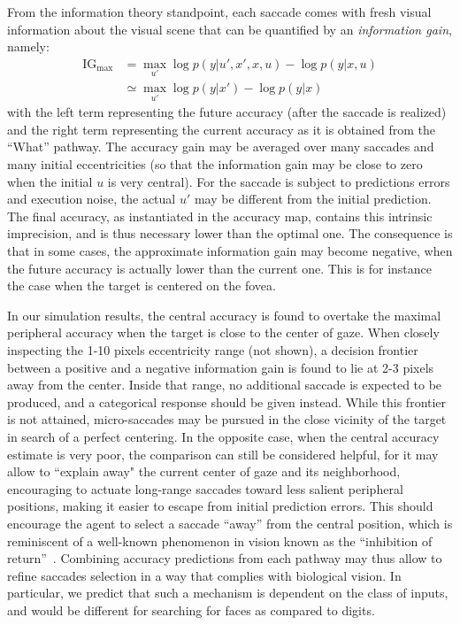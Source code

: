 From the information theory standpoint, each saccade comes with fresh visual information about the visual scene that can be quantified by an \emph{information gain}, namely:
\begin{align}
\text{IG}_\text{max} &= \max_{u'} \log p(y|u',x',x, u) - \log p(y|x, u)\nonumber\\
&\simeq \max_{u'} \log p(y|x') - \log p(y|x)\label{eq:IG}
\end{align}
with the left term representing the future accuracy (after the saccade is realized) and the right term representing the current accuracy as it is obtained from the ``What'' pathway. The accuracy gain may be averaged over many saccades and many initial eccentricities (so that the information gain may be close to zero when the initial $u$ is very central).
For the saccade is subject to predictions errors and execution noise, the actual $u'$ may be different from the initial prediction. The final accuracy, as instantiated in the accuracy map, contains this intrinsic imprecision, and is thus necessary lower than the optimal one. The consequence is that in some cases, the approximate information gain may become negative, when the future accuracy is actually lower than the current one. This is for instance the case when the target is centered on the fovea.

In our simulation results, the central accuracy is found to overtake the maximal peripheral accuracy when the target is close to the center of gaze. When closely inspecting the 1-10 pixels eccentricity range (not shown), a decision frontier between a positive and a negative information gain is found to lie at 2-3 pixels away from the center. Inside that range, no additional saccade is expected to be produced, and a categorical response should be given instead.  %
While this frontier is not attained, micro-saccades may be pursued in the close vicinity of the target in search of a perfect centering.
In the opposite case, when the central accuracy estimate is very poor, the comparison can still be considered helpful, for it may allow to ``explain away" the current center of gaze and its neighborhood, encouraging to actuate long-range saccades toward less salient peripheral positions, making it easier to escape from initial prediction errors.
This should encourage the agent to select a saccade ``away'' from the central position, which is reminiscent of a well-known phenomenon in vision known as the ``inhibition of return''~\cite{Itti01}. Combining accuracy predictions from each pathway may thus allow to refine saccades selection in a way that complies with biological vision.
In particular, we predict that such a mechanism is dependent on the class of inputs, and would be different for searching for faces as compared to digits.
\\

